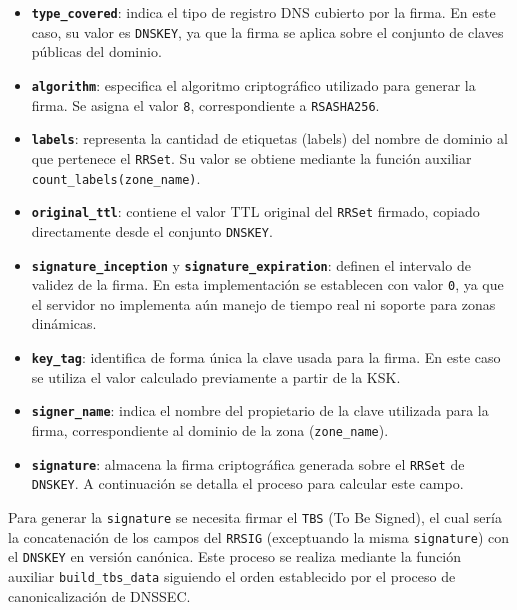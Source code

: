 \begin{itemize}
    \item \textbf{\texttt{type\_covered}}: indica el tipo de registro DNS cubierto por la firma.  
    En este caso, su valor es \texttt{DNSKEY}, ya que la firma se aplica sobre el conjunto de claves públicas del dominio.

    \item \textbf{\texttt{algorithm}}: especifica el algoritmo criptográfico utilizado para generar la firma.  
    Se asigna el valor \texttt{8}, correspondiente a \texttt{RSASHA256}.

    \item \textbf{\texttt{labels}}: representa la cantidad de etiquetas (labels) del nombre de dominio al que pertenece el \texttt{RRSet}.  
    Su valor se obtiene mediante la función auxiliar \texttt{count\_labels(zone\_name)}.

    \item \textbf{\texttt{original\_ttl}}: contiene el valor TTL original del \texttt{RRSet} firmado, copiado directamente desde el conjunto \texttt{DNSKEY}.

    \item \textbf{\texttt{signature\_inception}} y \textbf{\texttt{signature\_expiration}}: definen el intervalo de validez de la firma.  
    En esta implementación se establecen con valor \texttt{0}, ya que el servidor no implementa aún manejo de tiempo real ni soporte para zonas dinámicas.

    \item \textbf{\texttt{key\_tag}}: identifica de forma única la clave usada para la firma. En este caso se utiliza el valor calculado previamente a partir de la KSK.
    
    \item \textbf{\texttt{signer\_name}}: indica el nombre del propietario de la clave utilizada para la firma, correspondiente al dominio de la zona (\texttt{zone\_name}).
    
    \item \textbf{\texttt{signature}}: almacena la firma criptográfica generada sobre el \texttt{RRSet} de \texttt{DNSKEY}. A continuación se detalla el proceso para calcular este campo.
\end{itemize}

Para generar la \texttt{signature} se necesita firmar el \texttt{TBS} (To Be Signed), el cual sería la concatenación de los campos del \texttt{RRSIG} (exceptuando la misma \texttt{signature})
con el \texttt{DNSKEY} en versión canónica. Este proceso se realiza mediante la función auxiliar \texttt{build\_tbs\_data} siguiendo el orden establecido por el proceso de canonicalización de DNSSEC.

